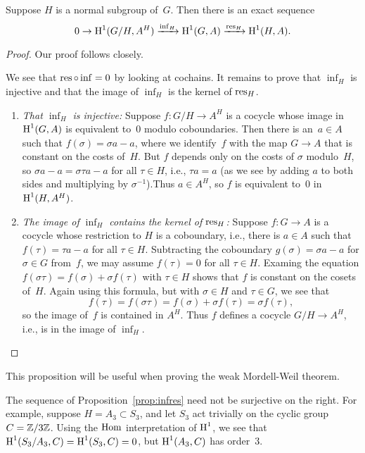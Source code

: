 \begin{proposition}\label{prop:infres}
Suppose $H$ is a normal subgroup of~$G$.
Then there is an exact sequence
$$
  0 \to \operatorname{H}^1(G/H, A^H)\xrightarrow{\operatorname{inf}_H}  \operatorname{H}^1(G,A)\xrightarrow{\operatorname{res}_H} \operatorname{H}^1(H,A).
$$
\end{proposition}
\begin{proof}
Our proof follows \cite[pg.~117]{serre:localfields} closely.

We see that $\operatorname{res}\circ \operatorname{inf} = 0$ by looking at cochains.  It remains
to prove that $\inf_H$ is injective and that the image of $\inf_H$
is the kernel of $\operatorname{res}_H$.
\begin{enumerate}

\item {\em That $\inf_H$ is injective:} Suppose $f:G/H\to A^H$ is a
  cocycle whose image in $\operatorname{H}^1(G,A)$ is equivalent to~$0$ modulo
  coboundaries.  Then there is an~$a\in A$ such that $f(\sigma) =
  \sigma a - a$, where we identify~$f$ with the map $G\to A$ that is
  constant on the costs of~$H$.  But $f$ depends only on the costs of
  $\sigma$ modulo~$H$, so $\sigma a - a = \sigma \tau a - a$ for all
  $\tau \in H$, i.e., $\tau a = a$ (as we see by adding $a$ to both
  sides and multiplying by $\sigma^{-1}$).Thus $a\in A^H$, so $f$ is
  equivalent to~$0$ in $\operatorname{H}^1(H,A^H)$.

\item {\em The image of $\inf_H$ contains the kernel of $\operatorname{res}_H$:}
Suppose $f:G\to A$ is a cocycle whose
restriction to $H$ is a coboundary, i.e., there is $a\in A$ such
that $f(\tau) = \tau a - a$ for all $\tau \in H$.
Subtracting the coboundary $g(\sigma) = \sigma a - a$ for $\sigma\in G$
from~$f$, we may assume $f(\tau) = 0$ for all $\tau \in H$.
Examing the equation $f(\sigma\tau) = f(\sigma) + \sigma f(\tau)$
with $\tau\in H$ shows that $f$ is constant on the cosets of~$H$.
Again using this formula, but with $\sigma\in H$ and $\tau\in G$, we see
that
$$
  f(\tau) = f(\sigma \tau) = f(\sigma) + \sigma f(\tau) = \sigma f(\tau),
$$
so the image of~$f$ is contained in $A^H$.  Thus $f$ defines a cocycle
$G/H \to A^H$, i.e., is in the image of $\inf_H$.
\end{enumerate}

\end{proof}

This proposition will be useful when proving
the weak Mordell-Weil theorem.

\begin{example}
The sequence of Proposition~\ref{prop:infres} need not be
surjective on the right.  For example, suppose $H=A_3 \subset S_3$,
and let $S_3$ act trivially on the cyclic group $C = \mathbb{Z}/3\mathbb{Z}$.
Using the $\operatorname{Hom}$ interpretation of $\operatorname{H}^1$, we see
that
$\operatorname{H}^1(S_3/A_3, C) = \operatorname{H}^1(S_3, C) = 0$, but
$\operatorname{H}^1(A_3, C)$ has order~$3$.
\end{example}


